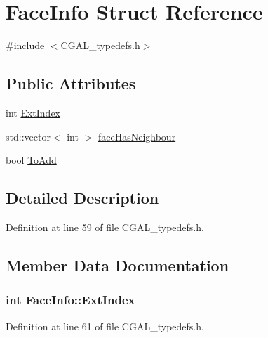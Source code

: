 \hypertarget{struct_face_info}{}\section{Face\+Info Struct Reference}
\label{struct_face_info}


{\ttfamily \#include $<$C\+G\+A\+L\+\_\+typedefs.\+h$>$}

\subsection*{Public Attributes}
\begin{DoxyCompactItemize}
\item 
int \hyperlink{struct_face_info_a1f11f68cdcc38bd174fe3d347f6f6488}{Ext\+Index}
\item 
std\+::vector$<$ int $>$ \hyperlink{struct_face_info_ad06cd2e3c94cb64c7b286237516ce6f8}{face\+Has\+Neighbour}
\item 
bool \hyperlink{struct_face_info_a5b2ee108652a00946acaa87f8f98d56f}{To\+Add}
\end{DoxyCompactItemize}


\subsection{Detailed Description}


Definition at line 59 of file C\+G\+A\+L\+\_\+typedefs.\+h.



\subsection{Member Data Documentation}
\hypertarget{struct_face_info_a1f11f68cdcc38bd174fe3d347f6f6488}{}
\subsubsection[{Ext\+Index}]{\setlength{\rightskip}{0pt plus 5cm}int Face\+Info\+::\+Ext\+Index}\label{struct_face_info_a1f11f68cdcc38bd174fe3d347f6f6488}


Definition at line 61 of file C\+G\+A\+L\+\_\+typedefs.\+h.

\hypertarget{struct_face_info_ad06cd2e3c94cb64c7b286237516ce6f8}{}
